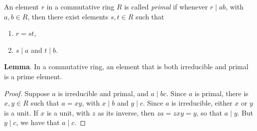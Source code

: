 \documentclass[12pt]{article}
\begin{document}
An element $r$ in a commutative ring $R$ is called \emph{primal} if whenever $r\mid ab$, with $a,b\in R$, then there 
exist elements $s,t\in R$ such that
\begin{enumerate}
\item $r=st$,
\item $s\mid a$ and $t\mid b$.
\end{enumerate}

\textbf{Lemma}.  In a commutative ring, an element that is both irreducible and primal is a prime element.
\begin{proof}
Suppose $a$ is irreducible and primal, and $a\mid bc$.  Since $a$ is primal, there is $x,y\in R$ such that $a=xy$, with $x\mid b$ and $y\mid c$.  Since $a$ is irreducible, either $x$ or $y$ is a unit.  If $x$ is a unit, with $z$ as its inverse, then $za=zxy=y$, so that $a\mid y$.  But $y\mid c$, we have that $a\mid c$.
\end{proof}
\end{document}

